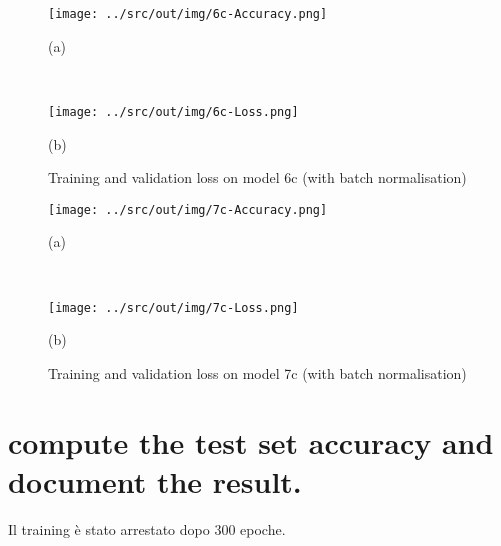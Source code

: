\documentclass[a4paper,12pt]{article} %
\begin{document}
	\begin{figure}[H]
		\begin{minipage}[c]{.49\textwidth}
			\centering
			\texttt{[image: ../src/out/img/6c-Accuracy.png]}
			\caption*{(a)}
		\end{minipage}
		~
		\begin{minipage}[c]{.49\textwidth}
			\centering
			\texttt{[image: ../src/out/img/6c-Loss.png]}
			\caption*{(b)}
		\end{minipage}
		\caption{Training and validation loss on model 6c (with batch 
		normalisation)}
		\label{fig:model6c-performance}
	\end{figure}

	\begin{figure}[H]
		\begin{minipage}[c]{.49\textwidth}
			\centering
			\texttt{[image: ../src/out/img/7c-Accuracy.png]}
			\caption*{(a)}
		\end{minipage}
		~
		\begin{minipage}[c]{.49\textwidth}
			\centering
			\texttt{[image: ../src/out/img/7c-Loss.png]}
			\caption*{(b)}
		\end{minipage}
		\caption{Training and validation loss on model 7c (with batch 
		normalisation)}
		\label{fig:model7c-performance}
	\end{figure}
	
	\section{compute the test set accuracy and document the result.} 
	\label{section:finalmodel}
	
	Il training è stato arrestato dopo 300 epoche.
	
%			
%			
\end{document}
